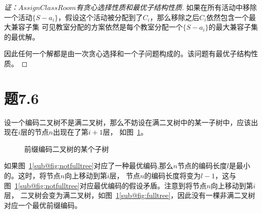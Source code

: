 \documentclass[a4paper,twoside]{article}
\begin{document}
\begin{spacing}{1.2}
\begin{proof}[证：$AssignClassRoom$有贪心选择性质和最优子结构性质]
如果在所有活动中移除一个活动$\{S-a_i\}$，假设这个活动被分配到了$C_i$，那么移除之后$C_i$依然包含一个最大兼容子集
可见教室分配的方案依然是每个教室分配一个$\{S-a_i\}$的最大兼容子集的最优解。

因此任何一个解都是由一次贪心选择和一个子问题构成的。该问题有最优子结构性质。

\end{proof}

\section{题7.6}

设一个编码二叉树不是满二叉树，那么不妨设在满二叉树中的某一子树中，应该出现在$i$层的节点$n$出现在了第$i+1$层，
如图~\ref{fig:codingtree}。

\begin{figure}[htbp]
	\centering
	\caption{前缀编码二叉树的某个子树}
	\label{fig:codingtree}
\end{figure}

如果图~\ref{fig:codingtree}\ref{sub@fig:notfulltree}对应了一种最优编码,那么$n$节点的编码长度$l$是最小的。这时，将节点$n$向上移动到第$i$层，
节点$n$的编码长度将变为$l-1$，这与图~\ref{fig:codingtree}\ref{sub@fig:notfulltree}对应最优编码的假设矛盾。注意到将节点$n$向上移动到第$i$层，
二叉树会变为满二叉树，如图~\ref{fig:codingtree}\ref{sub@fig:fulltree}，因此没有一棵非满二叉树对应一个最优前缀编码。


\end{spacing}
\end{document}
